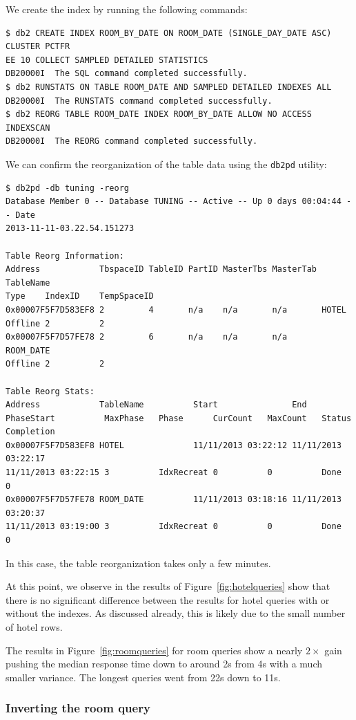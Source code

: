 \documentclass[letterpaper]{article}%
\begin{document}
We create the index by running the following commands:
\begin{Verbatim}
$ db2 CREATE INDEX ROOM_BY_DATE ON ROOM_DATE (SINGLE_DAY_DATE ASC) CLUSTER PCTFR
EE 10 COLLECT SAMPLED DETAILED STATISTICS
DB20000I  The SQL command completed successfully.
$ db2 RUNSTATS ON TABLE ROOM_DATE AND SAMPLED DETAILED INDEXES ALL
DB20000I  The RUNSTATS command completed successfully.
$ db2 REORG TABLE ROOM_DATE INDEX ROOM_BY_DATE ALLOW NO ACCESS INDEXSCAN
DB20000I  The REORG command completed successfully.
\end{Verbatim}
We can confirm the reorganization of the table data using the \texttt{db2pd}
utility:
\begin{Verbatim}
$ db2pd -db tuning -reorg
Database Member 0 -- Database TUNING -- Active -- Up 0 days 00:04:44 -- Date
2013-11-11-03.22.54.151273

Table Reorg Information:
Address            TbspaceID TableID PartID MasterTbs MasterTab TableName
Type    IndexID    TempSpaceID
0x00007F5F7D583EF8 2         4       n/a    n/a       n/a       HOTEL
Offline 2          2
0x00007F5F7D57FE78 2         6       n/a    n/a       n/a       ROOM_DATE
Offline 2          2

Table Reorg Stats:
Address            TableName          Start               End
PhaseStart          MaxPhase   Phase      CurCount   MaxCount   Status
Completion
0x00007F5F7D583EF8 HOTEL              11/11/2013 03:22:12 11/11/2013 03:22:17
11/11/2013 03:22:15 3          IdxRecreat 0          0          Done    0
0x00007F5F7D57FE78 ROOM_DATE          11/11/2013 03:18:16 11/11/2013 03:20:37
11/11/2013 03:19:00 3          IdxRecreat 0          0          Done    0
\end{Verbatim}
In this case, the table reorganization takes only a few minutes.

At this point, we observe in the results of Figure~\ref{fig:hotelqueries} show
that there is no significant difference between the results for hotel queries
with or without the indexes. As discussed already, this is likely due to the
small number of hotel rows.

The results in Figure~\ref{fig:roomqueries} for room queries show a nearly
$2\times$ gain pushing the median response time down to around 2s from 4s with
a much smaller variance. The longest queries went from 22s down to 11s.

\subsubsection{Inverting the room query}
\end{document}
